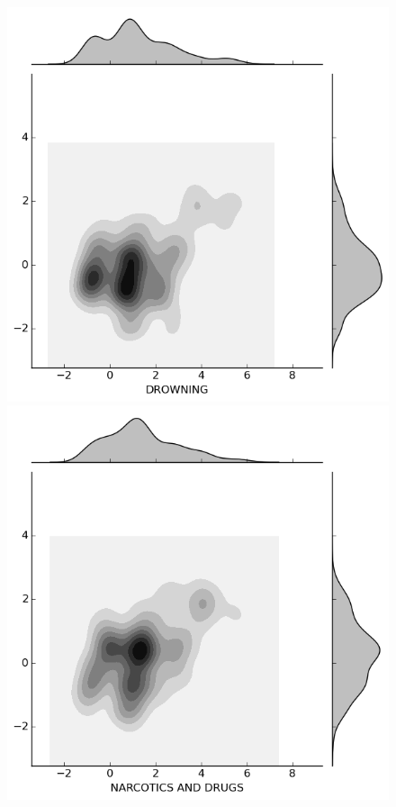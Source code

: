 \begin{figure}[H]
\begin{minipage}[b]{0.20\linewidth}
  \end{minipage}
  \quad
  \begin{minipage}[b]{0.20\linewidth}
    \includegraphics[width=\linewidth]{images/weapon/DROWNING.png}
  \end{minipage}
  \quad  
  \begin{minipage}[b]{0.20\linewidth}
    \includegraphics[width=\linewidth]{images/weapon/DRUGS.png}
  \end{minipage}
  

\end{figure}
